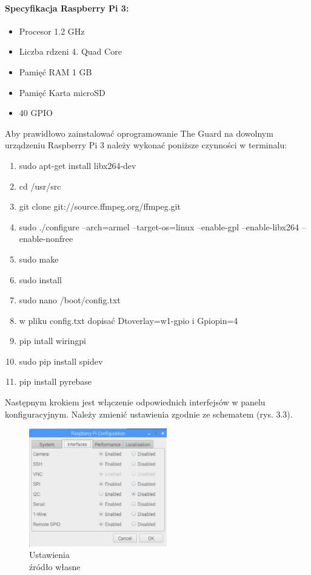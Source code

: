\paragraph{Specyfikacja Raspberry Pi 3:}
\begin{itemize} 
\item Procesor 1.2 GHz
\item Liczba rdzeni 4. Quad Core
\item Pamięć RAM 1 GB
\item Pamięć Karta microSD
\item 40 GPIO
\end{itemize}
Aby prawidłowo zainstalować oprogramowanie The Guard na dowolnym urządzeniu Raspberry Pi 3 należy wykonać poniższe czynności w terminalu:
\begin{enumerate} 
\item sudo apt-get install libx264-dev
\item cd /usr/src
\item git clone git://source.ffmpeg.org/ffmpeg.git
\item sudo ./configure --arch=armel --target-os=linux --enable-gpl --enable-libx264 --enable-nonfree
\item sudo make
\item sudo install
\item sudo nano /boot/config.txt
\item w pliku config.txt dopisać Dtoverlay=w1-gpio i Gpiopin=4
\item pip intall wiringpi
\item sudo pip install spidev
\item pip install pyrebase
\end{enumerate}
Następnym krokiem jest włączenie odpowiednich interfejsów w panelu konfiguracyjnym. Należy zmienić ustawienia zgodnie ze schematem (rys. 3.3).
\begin{figure}[ht]
	\centering
	\includegraphics[width=6cm]{RSettings}
	\caption{Ustawienia\\ źródło własne}
\end{figure}
